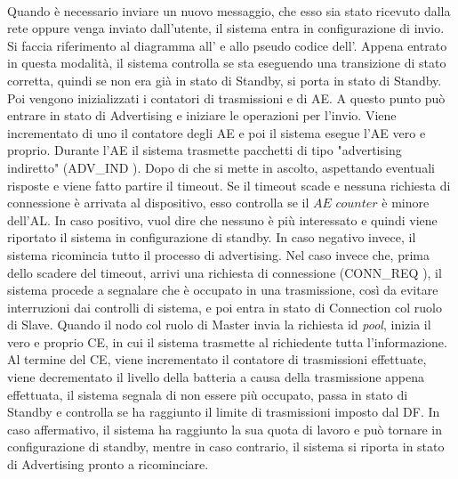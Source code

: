 \\
Quando è necessario inviare un nuovo messaggio, che esso sia stato ricevuto dalla rete oppure venga inviato dall'utente, il sistema entra in configurazione di invio. Si faccia riferimento al diagramma all' e allo pseudo codice dell'. Appena entrato in questa modalità, il sistema controlla se sta eseguendo una transizione di stato corretta, quindi se non era già in stato di Standby, si porta in stato di Standby. Poi vengono inizializzati i contatori di trasmissioni e di \acs{AE}. A questo punto può entrare in stato di Advertising e iniziare le operazioni per l'invio. Viene incrementato di uno il contatore degli \acs{AE} e poi il sistema esegue l'\acs{AE} vero e proprio. Durante l'\acs{AE} il sistema trasmette pacchetti di tipo "advertising indiretto" (ADV\_IND \cite{BT-CoreSpec4.0}). Dopo di che si mette in ascolto, aspettando eventuali risposte e viene fatto partire il timeout. Se il timeout scade e nessuna richiesta di connessione è arrivata al dispositivo, esso controlla se il $\textit{AE counter}$ è minore dell'\acs{AL}. In caso positivo, vuol dire che nessuno è più interessato e quindi viene riportato il sistema in configurazione di standby. In caso negativo invece, il sistema ricomincia tutto il processo di advertising. Nel caso invece che, prima dello scadere del timeout, arrivi una richiesta di connessione (CONN\_REQ \cite{BT-CoreSpec4.0}), il sistema procede a segnalare che è occupato in una trasmissione, così da evitare interruzioni dai controlli di sistema, e poi entra in stato di Connection col ruolo di Slave. Quando il nodo col ruolo di Master invia la richiesta id \textit{pool}, inizia il vero e proprio \acf{CE}, in cui il sistema trasmette al richiedente tutta l'informazione. Al termine del \acs{CE}, viene incrementato il contatore di trasmissioni effettuate, viene decrementato il livello della batteria a causa della trasmissione appena effettuata, il sistema segnala di non essere più occupato, passa in stato di Standby e controlla se ha raggiunto il limite di trasmissioni imposto dal \acs{DF}. In caso affermativo, il sistema ha raggiunto la sua quota di lavoro e può tornare in configurazione di standby, mentre in caso contrario, il sistema si riporta in stato di Advertising pronto a ricominciare.
\bigskip

